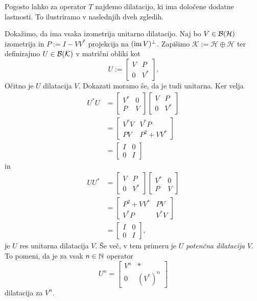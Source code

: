 Pogosto lahko za operator $T$ najdemo dilatacijo, ki ima določene dodatne lastnosti.
To ilustriramo v naslednjih dveh zgledih.


\begin{zgled}\label{zgl:1.1}
    Dokažimo, da ima vsaka izometrija unitarno dilatacijo.
    Naj bo $V \in \operatorname{\mathcal{B} (\mathcal{H})}$ izometrija in $P := I - V V^*$
    projekcija na $(\operatorname{im} V)^\perp$. Zapišimo $\mathcal{K} := \mathcal{H} \oplus \mathcal{H}$ ter 
    definirajmo $U \in \operatorname{\mathcal{B} (\mathcal{K})}$ v matrični obliki kot 
    $$U := \begin{bmatrix}
        V & P\\
        0 & V^*
    \end{bmatrix}.$$
    Očitno je $U$ dilatacija $V$. Dokazati moramo še, da je tudi unitarna. Ker velja
    \begin{align*}
        U^* U &= \begin{bmatrix}
            V^* & 0\\
            P & V
        \end{bmatrix} \begin{bmatrix}
            V & P\\
            0 & V^*
        \end{bmatrix}\\
        &= \begin{bmatrix}
            V^* V &  V^* P\\
            PV & P^2 + V V^*
        \end{bmatrix}\\
        &= \begin{bmatrix}
            I & 0\\
            0 & I
        \end{bmatrix}
    \end{align*}
    in 
    \begin{align*}
         U U^* &= \begin{bmatrix}
            V & P\\
            0 & V^*
        \end{bmatrix} \begin{bmatrix}
            V^* & 0\\
            P & V
        \end{bmatrix} \\
        &= \begin{bmatrix}
             P^2 + V V^* &  P V\\
            V^* P &V^* V 
        \end{bmatrix}\\
        &= \begin{bmatrix}
            I & 0\\
            0 & I
        \end{bmatrix},
    \end{align*}
    je $U$ res unitarna dilatacija $V$. Še več, v tem primeru je 
    $U$ \emph{potenčna dilatacija} $V$. To pomeni, da je za vsak $n \in \mathbb N$ operator
    $$U^n = \begin{bmatrix}
        V^n & *\\
        0 & (V^*) ^n
    \end{bmatrix}$$
    dilatacija za $V^n$.
\end{zgled}

